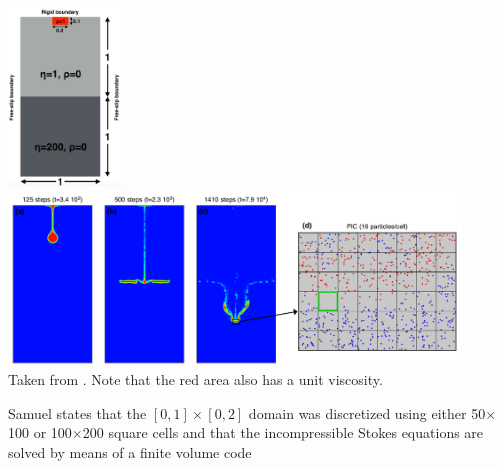 \begin{center}
\includegraphics[width=3cm]{python_codes/fieldstone_67/images/samu18a}
\includegraphics[width=12cm]{python_codes/fieldstone_67/images/samu18b}\\
{\captionfont Taken from \cite{samu18}. Note that the red area also has a unit viscosity.}
\end{center}

Samuel states that the $[0,1] \times [0,2]$ domain was discretized using either 50$\times$100 
or 100$\times$200 square cells and that the incompressible Stokes equations are solved by means 
of a finite volume code \cite{saev10,samu12}


